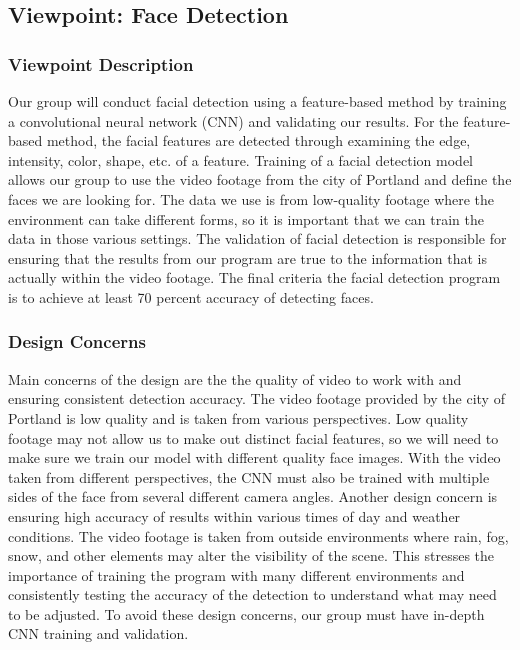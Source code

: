 \documentclass[onecolumn, draftclsnofoot,10pt, compsoc]{IEEEtran}
\begin{document}
\subsection{Viewpoint: Face Detection}
\subsubsection{Viewpoint Description}
Our group will conduct facial detection using a feature-based method by training a convolutional neural network (CNN) and validating our results. For the feature-based method, the facial features are detected through examining the edge, intensity, color, shape, etc. of a feature. Training of a facial detection model allows our group to use the video footage from the city of Portland and define the faces we are looking for. The data we use is from low-quality footage where the environment can take different forms, so it is important that we can train the data in those various settings. The validation of facial detection is responsible for ensuring that the results from our program are true to the information that is actually within the video footage. The final criteria the facial detection program is to achieve at least 70 percent accuracy of detecting faces. 
\subsubsection{Design Concerns}
Main concerns of the design are the the quality of video to work with and ensuring consistent detection accuracy. The video footage provided by the city of Portland is low quality and is taken from various perspectives. Low quality footage may not allow us to make out distinct facial features, so we will need to make sure we train our model with different quality face images. With the video taken from different perspectives, the CNN must also be trained with multiple sides of the face from several different camera angles. Another design concern is ensuring high accuracy of results within various times of day and weather conditions. The video footage is taken from outside environments where rain, fog, snow, and other elements may alter the visibility of the scene. This stresses the importance of training the program with many different environments and consistently testing the accuracy of the detection to understand what may need to be adjusted. To avoid these design concerns, our group must have in-depth CNN training and validation.
\end{document}
